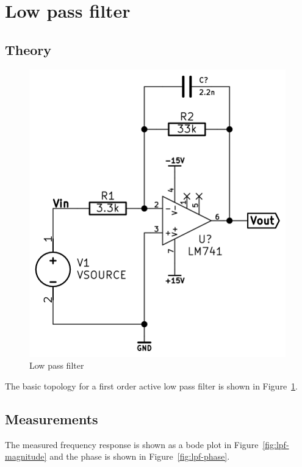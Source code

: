 \documentclass[11pt,a4paper]{article}
\begin{document}
\section{Low pass filter}\label{lowpass-filter}

\subsection{Theory}\label{lpf-theory}
\begin{figure}[htbp]
    \centering
        \includegraphics[scale=0.5]{img/lowpassfilter.png}
    \caption{Low pass filter}
    \label{fig:lpf-schem}
\end{figure}

The basic topology for a first order active low pass filter is shown in Figure~\ref{fig:lpf-schem}.

\subsection{Measurements}\label{lpf-measurements}
The measured frequency response is shown as a bode plot in Figure~\ref{fig:lpf-magnitude} and the phase is shown in Figure~\ref{fig:lpf-phase}.
\end{document}
